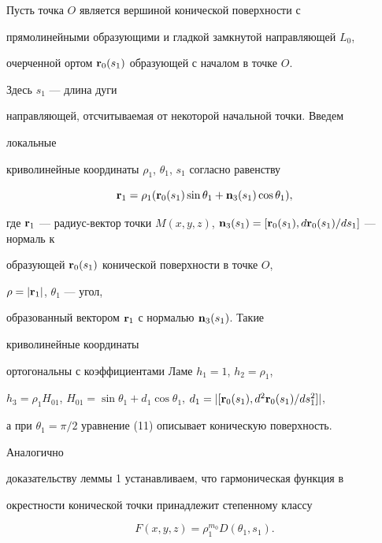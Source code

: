  


Пусть точка $O$ является вершиной конической поверхности с  


прямолинейными образующими и гладкой замкнутой направляющей $L_0$, 


очерченной ортом $\bold r_0(s_1)$ образующей с началом в точке $O$. 


Здесь $s_1$ --- длина дуги  


направляющей, отсчитываемая от некоторой начальной точки. Введем 


локальные  


криволинейные координаты $\rho_1$, $\theta_1$, $s_1$ согласно равенству 


\begin{equation} 


\bold r_1=\rho_1(\bold r_0(s_1)\sin\theta_1+ 


\bold n_3(s_1)\cos\theta_1), 


\end{equation} 


где $\bold r_1$ --- радиус-вектор точки $M(x,y,z)$, $\bold 


n_3(s_1)=[\bold r_0(s_1),d\bold r_0(s_1)/d s_1]$ --- нормаль к  


образующей $\bold r_0(s_1)$ конической поверхности в точке $O$, 


$\rho=|\bold r_1|$, $\theta_1$ --- угол,  


образованный вектором $\bold r_1$ с нормалью $\bold n_3(s_1)$. Такие 


криволинейные координаты 


ортогональны с коэффициентами Ламе $h_1=1$, $h_2=\rho_1$, 


$h_3=\rho_1H_{01}$, $H_{01}=\sin\theta_1+d_1\cos\theta_1$, $d_1=|[\bold 


r_0(s_1),d^2\bold r_0(s_1)/d s^2_1]|$, 


а при $\theta_1=\pi/2$ уравнение (11) описывает коническую поверхность. 


Аналогично  


доказательству леммы 1 устанавливаем, что гармоническая функция в  


окрестности конической точки принадлежит степенному классу 


\begin{equation} 


F(x,y,z)=\rho^{m_0}_1D(\theta_1,s_1). 


\end{equation} 


